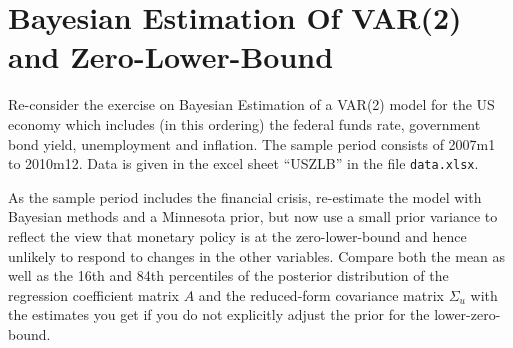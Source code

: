 \documentclass{article}
\begin{document}
\newpage
\section[Bayesian Estimation of VAR{(2)} and Zero-Lower-Bound]{Bayesian Estimation Of VAR{(2)} and Zero-Lower-Bound\label{ex:BayesianEstimationVARTwoZLB}}
Re-consider the exercise on Bayesian Estimation of a VAR{(2)} model for the US economy which includes (in this ordering) the federal funds rate, government bond yield, unemployment and inflation. The sample period consists of 2007m1 to 2010m12. Data is given in the excel sheet \enquote{USZLB} in the file \texttt{data.xlsx}.

As the sample period includes the financial crisis, re-estimate the model with Bayesian methods and a Minnesota prior, but now use a small prior variance to reflect the view that monetary policy is at the zero-lower-bound and hence unlikely to respond to changes in the other variables. Compare both the mean as well as the 16th and 84th percentiles of the posterior distribution of the regression coefficient matrix $A$ and the reduced-form covariance matrix $\Sigma_u$ with the estimates you get if you do not explicitly adjust the prior for the lower-zero-bound.


\newpage
\end{document}
